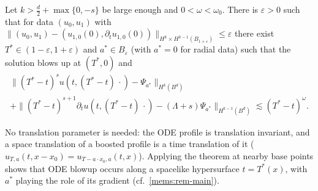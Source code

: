 \begin{theorem}[template]\label{fw:thm-template}
Let $k>\frac d2+\max\{0,-s\}$ be large enough and $0<\omega<\omega_0$.
There is $\varepsilon>0$ such that for data $(u_0,u_1)$ with
$\|(u_0,u_1)-(u_{1,0}(0),\partial_tu_{1,0}(0))\|_{H^k\times H^{k-1}(B_{1+\varepsilon})}\le\varepsilon$
there exist $T^*\in(1-\varepsilon,1+\varepsilon)$ and
$a^*\in B_\varepsilon$ (with $a^*=0$ for radial data) such that the
solution blows up at $(T^*,0)$ and
\begin{multline*}
  \big\|(T^*-t)^{s}u(t,(T^*-t)\,\cdot)-\Psi_{a^*}\big\|_{H^k(B^d)}\\
  +\big\|(T^*-t)^{s+1}\partial_tu(t,(T^*-t)\,\cdot)-(\Lambda+s)\Psi_{a^*}\big\|_{H^{k-1}(B^d)}
  \lesssim (T^*-t)^{\omega}.
\end{multline*}
\end{theorem}
No translation parameter is needed: the ODE profile is translation invariant,
and a space translation of a boosted profile is a time translation of it
($u_{T,a}(t,x-x_0)=u_{T-a\cdot x_0,a}(t,x)$). Applying the theorem at nearby
base points shows that ODE blowup occurs along a spacelike hypersurface
$t=T^*(x)$, with $a^*$ playing the role of its gradient (cf.\ \cref{mems:rem-main}).

